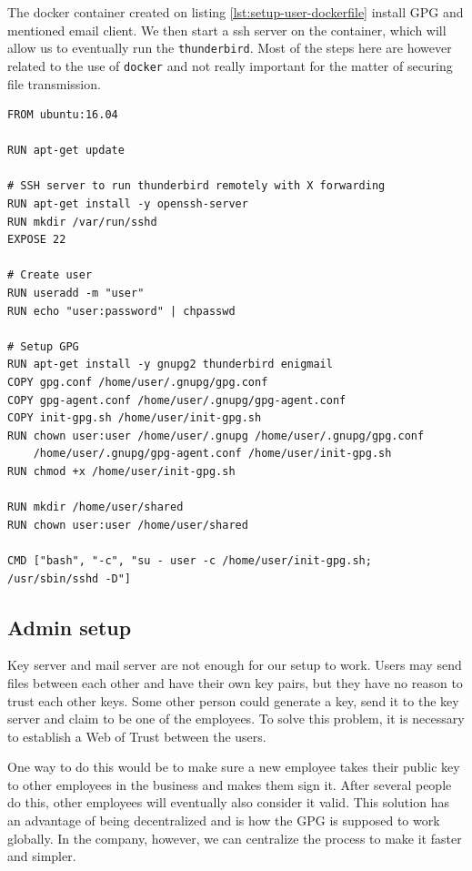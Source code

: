 \documentclass{classrep}
\newcommand\code[1]{\texttt{#1}}
\begin{document}
The docker container created on listing \ref{lst:setup-user-dockerfile} install GPG and mentioned
email client. We then start a ssh server on the container, which will allow us to eventually 
run the \code{thunderbird}. Most of the steps here are however related to the use of \code{docker}
and not really important for the matter of securing file transmission.

\begin{lstlisting}[label={lst:setup-user-dockerfile}, caption={Dockerfile describing user container.}]
FROM ubuntu:16.04

RUN apt-get update 

# SSH server to run thunderbird remotely with X forwarding
RUN apt-get install -y openssh-server
RUN mkdir /var/run/sshd
EXPOSE 22

# Create user
RUN useradd -m "user"
RUN echo "user:password" | chpasswd

# Setup GPG
RUN apt-get install -y gnupg2 thunderbird enigmail
COPY gpg.conf /home/user/.gnupg/gpg.conf
COPY gpg-agent.conf /home/user/.gnupg/gpg-agent.conf
COPY init-gpg.sh /home/user/init-gpg.sh
RUN chown user:user /home/user/.gnupg /home/user/.gnupg/gpg.conf 
    /home/user/.gnupg/gpg-agent.conf /home/user/init-gpg.sh
RUN chmod +x /home/user/init-gpg.sh

RUN mkdir /home/user/shared
RUN chown user:user /home/user/shared

CMD ["bash", "-c", "su - user -c /home/user/init-gpg.sh; /usr/sbin/sshd -D"]
\end{lstlisting}

\subsection{Admin setup}

Key server and mail server are not enough for our setup to work. 
Users may send files between each other and have their own key pairs, but
they have no reason to trust each other keys. Some other person could
generate a key, send it to the key server and claim to be one of the employees.
To solve this problem, it is necessary to establish a Web of Trust between the users.

One way to do this would be to make sure a new employee takes their public key
to other employees in the business and makes them sign it. After several people
do this, other employees will eventually also consider it valid. This solution
has an advantage of being decentralized and is how the GPG is supposed to work
globally. In the company, however, we can centralize the process to make it 
faster and simpler.
\end{document}

